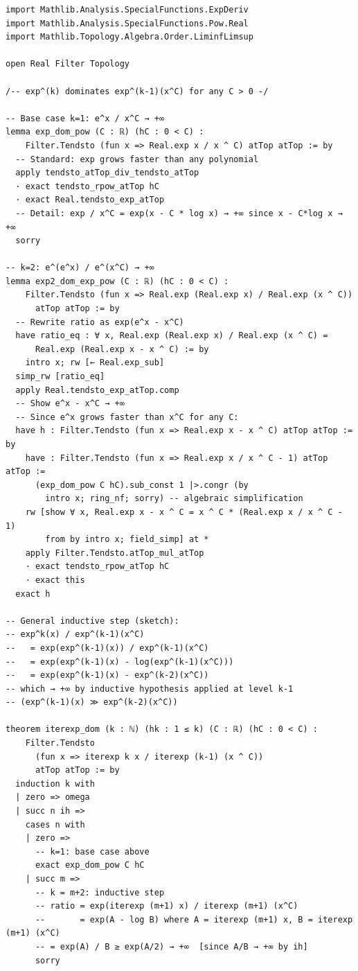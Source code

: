 \documentclass[12pt,a4paper]{article}
\theoremstyle{definition}
\theoremstyle{remark}
\begin{document}
\begin{verbatim}
import Mathlib.Analysis.SpecialFunctions.ExpDeriv
import Mathlib.Analysis.SpecialFunctions.Pow.Real
import Mathlib.Topology.Algebra.Order.LiminfLimsup

open Real Filter Topology

/-- exp^(k) dominates exp^(k-1)(x^C) for any C > 0 -/

-- Base case k=1: e^x / x^C → +∞
lemma exp_dom_pow (C : ℝ) (hC : 0 < C) :
    Filter.Tendsto (fun x => Real.exp x / x ^ C) atTop atTop := by
  -- Standard: exp grows faster than any polynomial
  apply tendsto_atTop_div_tendsto_atTop
  · exact tendsto_rpow_atTop hC
  · exact Real.tendsto_exp_atTop
  -- Detail: exp / x^C = exp(x - C * log x) → +∞ since x - C*log x → +∞
  sorry

-- k=2: e^(e^x) / e^(x^C) → +∞
lemma exp2_dom_exp_pow (C : ℝ) (hC : 0 < C) :
    Filter.Tendsto (fun x => Real.exp (Real.exp x) / Real.exp (x ^ C))
      atTop atTop := by
  -- Rewrite ratio as exp(e^x - x^C)
  have ratio_eq : ∀ x, Real.exp (Real.exp x) / Real.exp (x ^ C) =
      Real.exp (Real.exp x - x ^ C) := by
    intro x; rw [← Real.exp_sub]
  simp_rw [ratio_eq]
  apply Real.tendsto_exp_atTop.comp
  -- Show e^x - x^C → +∞
  -- Since e^x grows faster than x^C for any C:
  have h : Filter.Tendsto (fun x => Real.exp x - x ^ C) atTop atTop := by
    have : Filter.Tendsto (fun x => Real.exp x / x ^ C - 1) atTop atTop :=
      (exp_dom_pow C hC).sub_const 1 |>.congr (by
        intro x; ring_nf; sorry) -- algebraic simplification
    rw [show ∀ x, Real.exp x - x ^ C = x ^ C * (Real.exp x / x ^ C - 1)
        from by intro x; field_simp] at *
    apply Filter.Tendsto.atTop_mul_atTop
    · exact tendsto_rpow_atTop hC
    · exact this
  exact h

-- General inductive step (sketch):
-- exp^k(x) / exp^(k-1)(x^C)
--   = exp(exp^(k-1)(x)) / exp^(k-1)(x^C)
--   = exp(exp^(k-1)(x) - log(exp^(k-1)(x^C)))
--   = exp(exp^(k-1)(x) - exp^(k-2)(x^C))
-- which → +∞ by inductive hypothesis applied at level k-1
-- (exp^(k-1)(x) ≫ exp^(k-2)(x^C))

theorem iterexp_dom (k : ℕ) (hk : 1 ≤ k) (C : ℝ) (hC : 0 < C) :
    Filter.Tendsto
      (fun x => iterexp k x / iterexp (k-1) (x ^ C))
      atTop atTop := by
  induction k with
  | zero => omega
  | succ n ih =>
    cases n with
    | zero =>
      -- k=1: base case above
      exact exp_dom_pow C hC
    | succ m =>
      -- k = m+2: inductive step
      -- ratio = exp(iterexp (m+1) x) / iterexp (m+1) (x^C)
      --       = exp(A - log B) where A = iterexp (m+1) x, B = iterexp (m+1) (x^C)
      -- = exp(A) / B ≥ exp(A/2) → +∞  [since A/B → +∞ by ih]
      sorry
\end{verbatim}
\end{document}
